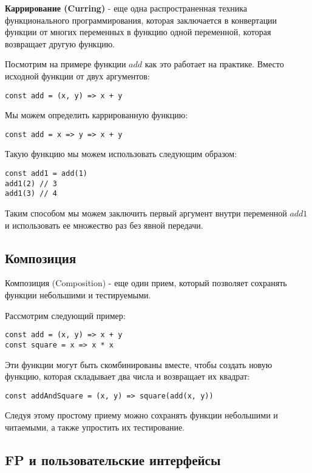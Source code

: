 \textbf{Каррирование (Curring)} - еще одна распространенная техника функционального программирования, которая заключается в конвертации функции от многих переменных в функцию одной переменной, которая возвращает другую функцию.

Посмотрим на примере функции $add$ как это работает на практике. Вместо исходной функции от двух аргументов:

\begin{lstlisting}
const add = (x, y) => x + y
\end{lstlisting}

Мы можем определить каррированную функцию:

\begin{lstlisting}
const add = x => y => x + y
\end{lstlisting}

Такую функцию мы можем использовать следующим образом:

\begin{lstlisting}
const add1 = add(1)
add1(2) // 3
add1(3) // 4
\end{lstlisting}

Таким способом мы можем заключить первый аргумент внутри переменной $add1$ и использовать ее множество раз без явной передачи.

\subsection*{Композиция}

Композиция (Composition) - еще один прием, который позволяет сохранять функции небольшими и тестируемыми.

Рассмотрим следующий пример:

\begin{lstlisting}
const add = (x, y) => x + y
const square = x => x * x
\end{lstlisting}

Эти функции могут быть скомбинированы вместе, чтобы создать новую функцию, которая складывает два числа и возвращает их квадрат:

\begin{lstlisting}
const addAndSquare = (x, y) => square(add(x, y))
\end{lstlisting}

Следуя этому простому приему можно сохранять функции небольшими и читаемыми, а также упростить их тестирование.



\subsection*{FP и пользовательские интерфейсы}


